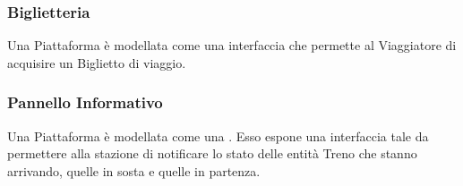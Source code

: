 		\subsubsection{Biglietteria}
		
		Una Piattaforma è modellata come una interfaccia che permette al Viaggiatore di acquisire un Biglietto di viaggio. 
		
		\subsubsection{Pannello Informativo}
		
		Una Piattaforma è modellata come una . Esso espone una interfaccia tale da permettere alla stazione di notificare lo stato delle entità Treno che stanno arrivando, quelle in sosta e quelle in partenza.
\newpage
